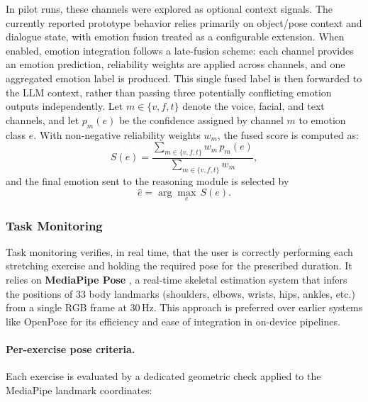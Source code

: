 \documentclass[pdflatex,sn-basic,Numbered,iicol,twocolumn]{sn-jnl}%
\begin{document}
In pilot runs, these channels were explored as optional context signals. The currently reported prototype behavior relies primarily on object/pose context and dialogue state, with emotion fusion treated as a configurable extension.
When enabled, emotion integration follows a late-fusion scheme: each channel provides an emotion prediction, reliability weights are applied across channels, and one aggregated emotion label is produced. This single fused label is then forwarded to the LLM context, rather than passing three potentially conflicting emotion outputs independently.
Let $m \in \{v,f,t\}$ denote the voice, facial, and text channels, and let $p_m(e)$ be the confidence assigned by channel $m$ to emotion class $e$. With non-negative reliability weights $w_m$, the fused score is computed as:
\begin{equation}
S(e)=\frac{\sum_{m \in \{v,f,t\}} w_m\,p_m(e)}{\sum_{m \in \{v,f,t\}} w_m},
\label{eq:emotion_fusion}
\end{equation}
and the final emotion sent to the reasoning module is selected by
\begin{equation}
\hat{e}=\arg\max_e\, S(e).
\label{eq:emotion_argmax}
\end{equation}

\subsubsection{Task Monitoring}
Task monitoring verifies, in real time, that the user is correctly performing each stretching exercise and holding the required pose for the prescribed duration. It relies on \textbf{MediaPipe Pose} \cite{MediaPipe2020}, a real-time skeletal estimation system that infers the positions of 33 body landmarks (shoulders, elbows, wrists, hips, ankles, etc.) from a single RGB frame at 30\,Hz. This approach is preferred over earlier systems like OpenPose \cite{Cao2019} for its efficiency and ease of integration in on-device pipelines.

\paragraph{Per-exercise pose criteria.}
Each exercise is evaluated by a dedicated geometric check applied to the MediaPipe landmark coordinates:
\end{document}
